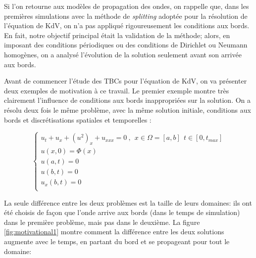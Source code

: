 \indent Si l'on retourne aux modèles de propagation des ondes, on rappelle que, dans les premières simulations avec la méthode de \emph{splitting} adoptée pour la résolution de l'équation de KdV, on n'a pas appliqué rigoureusement les conditions aux bords. En fait, notre objectif principal était la validation de la méthode; alors, en imposant des conditions périodiques ou des conditions de Dirichlet ou Neumann homogènes, on a analysé l'évolution de la solution seulement avant son arrivée aux bords.

\indent Avant de commencer l'étude des TBCs pour l'équation de KdV, on va présenter deux exemples de motivation à ce travail. Le premier exemple montre très clairement l'influence de conditions aux bords inappropriées sur la solution. On a résolu deux fois le même problème, avec la même solution initiale, conditions aux bords et discrétisations spatiales et temporelles :

\begin{equation*}
    \begin{cases}
    u_t + u_x + (u^2)_x + u_{xxx} = 0 \ , \ \ x \in \Omega=[a,b] \ \ t \in [0, t_{max}] \\
    u(x,0) = \Phi(x) \\
    u(a,t) = 0 \\
    u(b,t) = 0 \\
    u_x(b,t) = 0  \\ 
    \end{cases}
\end{equation*}

\indent La seule différence entre les deux problèmes est la taille de leurs domaines: ils ont été choisis de façon que l'onde arrive aux bords (dans le temps de simulation) dans le première problème, mais pas dans le deuxième. La figure \ref{fig:motivational1} montre comment la différence entre les deux solutions augmente avec le temps, en partant du bord et se propageant pour tout le domaine:

\indent

